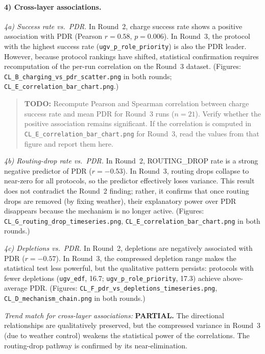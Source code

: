 \paragraph{4) Cross-layer associations.}

\emph{4a) Success rate vs.\ PDR.}
In Round~2, charge success rate shows a positive association with PDR
(Pearson $r = 0.58$, $p = 0.006$).  In Round~3, the protocol with
the highest success rate (\texttt{ugv\_p\_role\_priority}) is also the
PDR leader.  However, because protocol rankings have shifted,
statistical confirmation requires recomputation of the per-run
correlation on the Round~3 dataset.
(Figures: \texttt{CL\_B\_charging\_vs\_pdr\_scatter.png} in both
rounds; \texttt{CL\_E\_correlation\_bar\_chart.png}.)

\begin{quote}\textbf{TODO:} Recompute Pearson and Spearman correlation
between charge success rate and mean PDR for Round~3 runs ($n = 21$).
Verify whether the positive association remains significant.  If the
correlation is computed in
\texttt{CL\_E\_correlation\_bar\_chart.png} for Round~3, read the
values from that figure and report them here.\end{quote}

\emph{4b) Routing-drop rate vs.\ PDR.}
In Round~2, ROUTING\_DROP rate is a strong negative predictor of PDR
($r = -0.53$).  In Round~3, routing drops collapse to near-zero for
all protocols, so the predictor effectively loses variance.  This
result does not contradict the Round~2 finding; rather, it confirms
that once routing drops are removed (by fixing weather), their
explanatory power over PDR disappears because the mechanism is no
longer active.
(Figures: \texttt{CL\_G\_routing\_drop\_timeseries.png},
\texttt{CL\_E\_correlation\_bar\_chart.png} in both rounds.)

\emph{4c) Depletions vs.\ PDR.}
In Round~2, depletions are negatively associated with PDR
($r = -0.57$).  In Round~3, the compressed depletion range makes the
statistical test less powerful, but the qualitative pattern persists:
protocols with fewer depletions (\texttt{ugv\_edf}, 16.7;
\texttt{ugv\_p\_role\_priority}, 17.3) achieve above-average PDR.
(Figures: \texttt{CL\_F\_pdr\_vs\_depletions\_timeseries.png},
\texttt{CL\_D\_mechanism\_chain.png} in both rounds.)

\emph{Trend match for cross-layer associations:} \textbf{PARTIAL.}
The directional relationships are qualitatively preserved, but the
compressed variance in Round~3 (due to weather control) weakens the
statistical power of the correlations.  The routing-drop pathway is
confirmed by its near-elimination.

